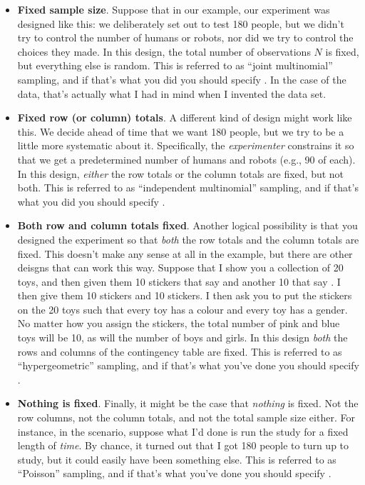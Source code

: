 \begin{itemize}
\item {\bf Fixed sample size}. Suppose that in our  example, our experiment was designed like this: we deliberately set out to test 180 people, but we didn't try to control the number of humans or robots, nor did we try to control the choices they made. In this design, the total number of observations $N$ is fixed, but everything else is random. This is referred to as ``joint multinomial'' sampling, and if that's what you did you should specify . In the case of the  data, that's actually what I had in mind when I invented the data set.
\item {\bf Fixed row (or column) totals}. A different kind of design might work like this. We decide ahead of time that we want 180 people, but we try to be a little more systematic about it. Specifically, the {\it experimenter} constrains it so that we get a predetermined number of humans and robots (e.g., 90 of each). In this design, {\it either} the row totals or the column totals are fixed, but not both. This is referred to as ``independent multinomial'' sampling, and if that's what you did you should specify . 
\item {\bf Both row and column totals fixed}. Another logical possibility is that you designed the experiment so that {\it both} the row totals and the column totals are fixed. This doesn't make any sense at all in the  example, but there are other deisgns that can work this way. Suppose that I show you a collection of 20 toys, and then given them 10 stickers that say  and another 10 that say . I then give them 10  stickers and 10  stickers. I then ask you to put the stickers on the 20 toys such that every toy has a colour and every toy has a gender. No matter how you assign the stickers, the total number of pink and blue toys will be 10, as will the number of boys and girls. In this design {\it both} the rows and columns of the contingency table are fixed. This is referred to as ``hypergeometric'' sampling, and if that's what you've done you should specify .
\item {\bf Nothing is fixed}. Finally, it might be the case that {\it nothing} is fixed. Not the row columns, not the column totals, and not the total sample size either. For instance, in the  scenario, suppose what I'd done is run the study for a fixed length of {\it time}. By chance, it turned out that I got 180 people to turn up to study, but it could easily have been something else. This is referred to as ``Poisson'' sampling, and if that's what you've done you should specify .
\end{itemize}

